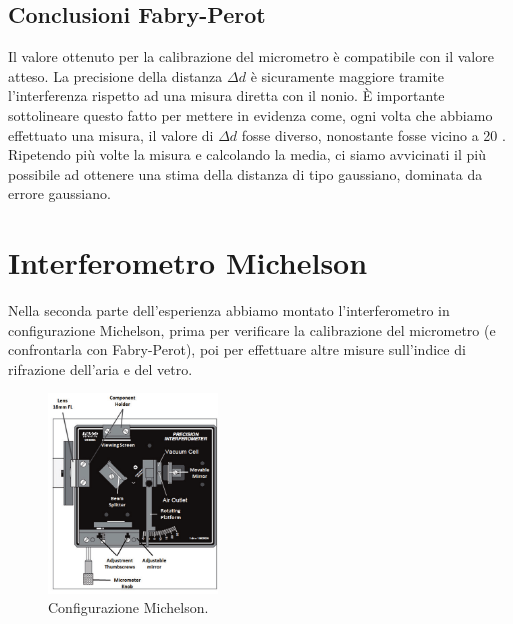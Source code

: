 \documentclass[letterpaper,12pt]{article}
\begin{document}
\subsection{Conclusioni Fabry-Perot}
Il valore ottenuto per la calibrazione del micrometro è compatibile con il valore atteso. La precisione della 
distanza $\Delta d$ è sicuramente maggiore tramite l'interferenza rispetto ad una misura diretta con il nonio.
È importante sottolineare questo fatto per mettere in evidenza come, ogni volta che abbiamo effettuato una misura, 
il valore di $\Delta d$ fosse diverso, nonostante fosse vicino a 20 . Ripetendo più volte
la misura e calcolando la media, ci siamo avvicinati il più possibile ad ottenere una stima della distanza di tipo 
gaussiano, dominata da errore gaussiano. \\

\newpage
\section{Interferometro Michelson}
Nella seconda parte dell'esperienza abbiamo montato l'interferometro in configurazione Michelson, prima per verificare 
la calibrazione del micrometro (e confrontarla con Fabry-Perot), poi per effettuare altre misure sull'indice di rifrazione
dell'aria e del vetro.
\begin{figure}[h]
    \centering
    \includegraphics[width=0.4\textwidth]{Michelson_aria.png}
    \caption{Configurazione Michelson.}
    \label{fig:michelson config}
\end{figure}
\end{document}
